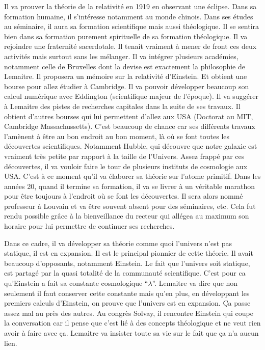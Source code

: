Il va prouver la théorie de la relativité en 1919 en observant une éclipse.
Dans sa formation humaine, il s'intéresse notamment au monde chinois.
Dans ses études au séminaire, il aura sa formation scientifique mais aussi théologique.
Il se sentira bien dans sa formation purement spirituelle de sa formation théologique.
Il va rejoindre une fraternité sacerdotale.
Il tenait vraiment à mener de front ces deux activités mais surtout sans les mélanger.
Il va intégrer plusieurs académies, notamment celle de Bruxelles dont la devise est exactement la philosophie de Lemaitre.
Il proposera un mémoire sur la relativité d'Einstein.
Et obtient une bourse pour allez étudier à Cambridge.
Il va pouvoir développer beaucoup son calcul numérique avec Eddington (scientifique majeur de l'époque).
Il va suggérer à Lemaitre des pistes de recherches capitales dans la suite de ses travaux.
Il obtient d'autres bourses qui lui permettent d'allez aux USA (Doctorat au MIT, Cambridge Massachussetts).
C'est beaucoup de chance car ses différents travaux l'amènent à être au bon endroit au bon moment, là où se font toutes les découvertes scientifiques.
Notamment Hubble, qui découvre que notre galaxie est vraiment très petite par rapport à la taille de l'Univers.
Assez frappé par ces découvertes, il va vouloir faire le tour de plusieurs instituts de cosmologie aux USA.
C'est à ce moment qu'il va élaborer sa théorie sur l'atome primitif.
Dans les années 20, quand il termine sa formation, il va se livrer à un véritable marathon pour être toujours à l'endroit où se font les découvertes.
Il sera alors nommé professeur à Louvain et va être souvent absent pour des séminaires, etc.
Cela fut rendu possible grâce à la bienveillance du recteur qui allégea au maximum son horaire pour lui permettre de continuer ses recherches.

Dans ce cadre, il va développer sa théorie comme quoi l'univers n'est pas statique, il est en expansion.
Il est le principal pionnier de cette théorie.
Il avait beaucoup d'opposants, notamment Einstein.
Le fait que l'univers soit statique, est partagé par la quasi totalité de la communauté scientifique.
C'est pour ca qu'Einstein a fait sa constante cosmologique ``$\lambda$''.
Lemaitre va dire que non seulement il faut conserver cette constante mais qu'en plus, en développant les premiers calculs d'Einstein, on prouve que l'univers est en expansion.
Ça passe assez mal au près des autres.
Au congrès Solvay, il rencontre Einstein qui coupe la conversation car il pense que c'est lié à des concepts théologique et  ne veut rien avoir à faire avec ça.
Lemaitre va insister toute sa vie sur le fait que ça n'a aucun lien.

